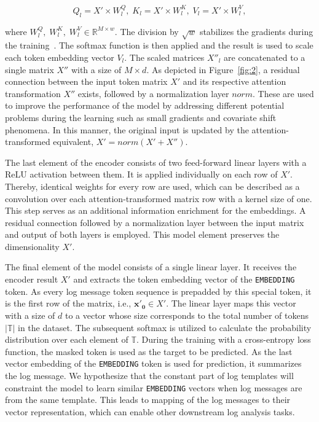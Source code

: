 \begin{equation}
    Q_l= X' \times W_{l}^{Q}, \; K_l= X' \times W_{l}^{K}, \; V_l= X' \times W_{l}^{V},
\end{equation}

where $W_{l}^{Q}, \; W_{l}^{K}, \; W_{l}^{V} \in \mathbb{R}^{M \times w}$. The division by $\sqrt{w}$ stabilizes the gradients during the training~\cite{vaswani2017attention}. The softmax function is then applied and the result is used to scale each token embedding vector $V_{l}$. The scaled matrices $X''_l$ are concatenated to a single matrix $X''$ with a size of $M \times d$. As depicted in Figure~\ref{fig:2}, a residual connection between the input token matrix $X'$ and its respective attention transformation $X''$ exists, followed by a normalization layer $norm$. These are used to improve the performance of the model by addressing different potential problems during the learning such as small gradients and covariate shift phenomena. In this manner, the original input is updated by the attention-transformed equivalent, $X' = norm(X' + X'')$.

The last element of the encoder consists of two feed-forward linear layers with a ReLU activation between them. It is applied individually on each row of $X'$. Thereby, identical weights for every row are used, which can be described as a convolution over each attention-transformed matrix row with a kernel size of one. This step serves as an additional information enrichment for the embeddings. A residual connection followed by a normalization layer between the input matrix and output of both layers is employed. This model element preserves the dimensionality $X'$.

The final element of the model consists of a single linear layer. It receives the encoder result $X'$ and extracts the token embedding vector of the \texttt{EMBEDDING} token. As every log message token sequence is prepadded by this special token, it is the first row of the matrix, i.e., $\mathbf{x'_0} \in X'$. The linear layer maps this vector with a size of $d$ to a vector whose size corresponds to the total number of tokens $|\mathbb{T}|$ in the dataset. The subsequent softmax is utilized to calculate the probability distribution over each element of $\mathbb{T}$. During the training with a cross-entropy loss function, the masked token is used as the target to be predicted. As the last vector embedding of the \texttt{EMBEDDING} token is used for prediction, it summarizes the log message. We hypothesize that the constant part of log templates will constraint the model to learn similar \texttt{EMBEDDING} vectors when log messages are from the same template. This leads to mapping of the log messages to their vector representation, which can enable other downstream log analysis tasks.

